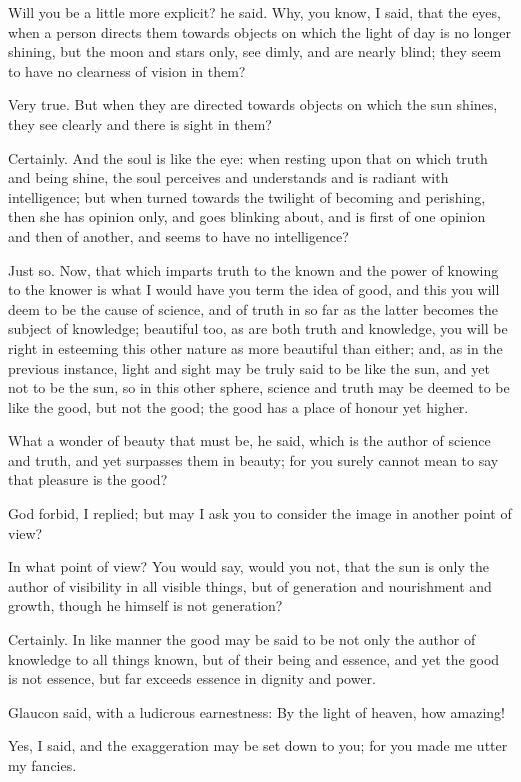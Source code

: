 Will you be a little more explicit? he said.
Why, you know, I said, that the eyes, when a person directs them towards objects on which the light of day is no longer shining, but the moon and stars only, see dimly, and are nearly blind; they seem to have no clearness of vision in them?

Very true.
But when they are directed towards objects on which the sun shines, they see clearly and there is sight in them?

Certainly.
And the soul is like the eye: when resting upon that on which truth and being shine, the soul perceives and understands and is radiant with intelligence; but when turned towards the twilight of becoming and perishing, then she has opinion only, and goes blinking about, and is first of one opinion and then of another, and seems to have no intelligence?

Just so.
Now, that which imparts truth to the known and the power of knowing to the knower is what I would have you term the idea of good, and this you will deem to be the cause of science, and of truth in so far as the latter becomes the subject of knowledge; beautiful too, as are both truth and knowledge, you will be right in esteeming this other nature as more beautiful than either; and, as in the previous instance, light and sight may be truly said to be like the sun, and yet not to be the sun, so in this other sphere, science and truth may be deemed to be like the good, but not the good; the good has a place of honour yet higher.

What a wonder of beauty that must be, he said, which is the author of science and truth, and yet surpasses them in beauty; for you surely cannot mean to say that pleasure is the good?

God forbid, I replied; but may I ask you to consider the image in another point of view?

In what point of view?
You would say, would you not, that the sun is only the author of visibility in all visible things, but of generation and nourishment and growth, though he himself is not generation?

Certainly.
In like manner the good may be said to be not only the author of knowledge to all things known, but of their being and essence, and yet the good is not essence, but far exceeds essence in dignity and power.

Glaucon said, with a ludicrous earnestness: By the light of heaven, how amazing!

Yes, I said, and the exaggeration may be set down to you; for you made me utter my fancies.

